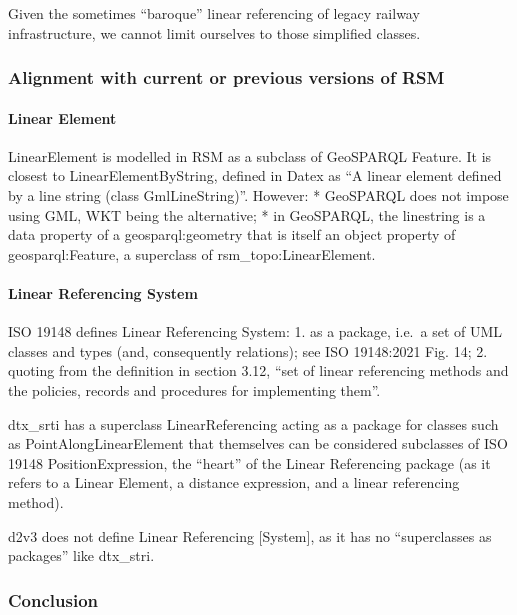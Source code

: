 \documentclass[
  11pt,
]{article}
\begin{document}
Given the sometimes ``baroque'' linear referencing of legacy railway
infrastructure, we cannot limit ourselves to those simplified classes.

\hypertarget{alignment-with-current-or-previous-versions-of-rsm}{%
\subsubsection{Alignment with current or previous versions of
RSM}\label{alignment-with-current-or-previous-versions-of-rsm}}

\hypertarget{linear-element}{%
\paragraph{Linear Element}\label{linear-element}}

LinearElement is modelled in RSM as a subclass of GeoSPARQL Feature. It
is closest to LinearElementByString, defined in Datex as ``A linear
element defined by a line string (class GmlLineString)''. However: *
GeoSPARQL does not impose using GML, WKT being the alternative; * in
GeoSPARQL, the linestring is a data property of a geosparql:geometry
that is itself an object property of geosparql:Feature, a superclass of
rsm\_topo:LinearElement.

\hypertarget{linear-referencing-system}{%
\paragraph{Linear Referencing System}\label{linear-referencing-system}}

ISO 19148 defines Linear Referencing System: 1. as a package, i.e.~a set
of UML classes and types (and, consequently relations); see ISO
19148:2021 Fig. 14; 2. quoting from the definition in section 3.12,
``set of linear referencing methods and the policies, records and
procedures for implementing them''.

dtx\_srti has a superclass LinearReferencing acting as a package for
classes such as PointAlongLinearElement that themselves can be
considered subclasses of ISO 19148 PositionExpression, the ``heart'' of
the Linear Referencing package (as it refers to a Linear Element, a
distance expression, and a linear referencing method).

d2v3 does not define Linear Referencing {[}System{]}, as it has no
``superclasses as packages'' like dtx\_stri.

\hypertarget{conclusion}{%
\subsubsection{Conclusion}\label{conclusion}}
\end{document}
